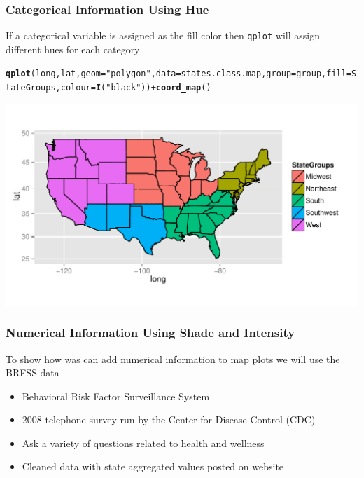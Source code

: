 \documentclass{beamer}\usepackage[]{graphicx}\usepackage[]{color}
\makeatletter
\newcommand{\hlstr}[1]{\textcolor[rgb]{0.192,0.494,0.8}{#1}}%
\newcommand{\hlopt}[1]{\textcolor[rgb]{0,0,0}{#1}}%
\newcommand{\hlstd}[1]{\textcolor[rgb]{0.345,0.345,0.345}{#1}}%
\newcommand{\hlkwc}[1]{\textcolor[rgb]{0.333,0.667,0.333}{#1}}%
\newcommand{\hlkwd}[1]{\textcolor[rgb]{0.737,0.353,0.396}{\textbf{#1}}}%
\newenvironment{kframe}{%
 \def\at@end@of@kframe{}%
 \ifinner\ifhmode%
  \def\at@end@of@kframe{\end{minipage}}%
  \begin{minipage}{\columnwidth}%
 \fi\fi%
 \def\FrameCommand##1{\hskip\@totalleftmargin \hskip-\fboxsep
 \colorbox{shadecolor}{##1}\hskip-\fboxsep
     \hskip-\linewidth \hskip-\@totalleftmargin \hskip\columnwidth}%
 \MakeFramed {\advance\hsize-\width
   \@totalleftmargin\z@ \linewidth\hsize
   \@setminipage}}%
 {\par\unskip\endMakeFramed%
 \at@end@of@kframe}
\newenvironment{knitrout}{}{} %
\makeatother
\begin{document}
\begin{frame}[fragile]
    \frametitle{Categorical Information Using Hue}
If a categorical variable is assigned as the fill color then \texttt{qplot} will assign different hues for each category
    
    \small
\begin{knitrout}\footnotesize
{}\color{fgcolor}\begin{kframe}
\begin{alltt}
\hlkwd{qplot}\hlstd{(long, lat,} \hlkwc{geom}\hlstd{=}\hlstr{"polygon"}\hlstd{,} \hlkwc{data}\hlstd{=states.class.map,} \hlkwc{group}\hlstd{=group,} \hlkwc{fill}\hlstd{=StateGroups,} \hlkwc{colour}\hlstd{=}\hlkwd{I}\hlstd{(}\hlstr{"black"}\hlstd{))} \hlopt{+} \hlkwd{coord_map}\hlstd{()}
\end{alltt}
\end{kframe}
\includegraphics[width=\textwidth]{figure/kstatescolored} 

\end{knitrout}
    \normalsize
\end{frame}


\begin{frame}
    \frametitle{Numerical Information Using Shade and Intensity}
    
    To show how was can add numerical information to map plots we will use the BRFSS data
    
    \begin{itemize}
        \item Behavioral Risk Factor Surveillance System
        \item 2008 telephone survey run by the Center for Disease Control (CDC)
        \item Ask a variety of questions related to health and wellness
        \item Cleaned data with state aggregated values posted on website
    \end{itemize}    
\end{frame}
\end{document}
